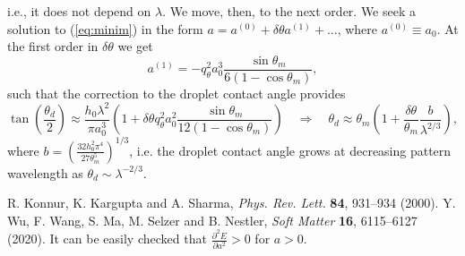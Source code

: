 \documentclass[amsmath,amssymb,showpacs,prl,superscriptaddress,notitlepage]{revtex4-1}
\begin{document}
i.e., it does not depend on $\lambda$. We move, then, to the next order. We seek a solution to
(\ref{eq:minim}) in the form $a = a^{(0)} + \delta \theta a^{(1)} + \dots$, where $a^{(0)} \equiv a_0$.
At the first order in $\delta \theta$ we get
\begin{equation}
a^{(1)} = -q_{\theta}^2 a_0^3\frac{\sin \theta_m}{6(1-\cos \theta_m)},
\end{equation}
such that the correction to the droplet contact angle provides
\begin{equation}
  \tan \left(\frac{\theta_d}{2}\right) \approx \frac{h_0 \lambda^2}{\pi a_0^3}
  \left(1+\delta \theta q_{\theta}^2 a_0^2 \frac{\sin \theta_m}{12(1-\cos \theta_m)}\right)
  \quad \Rightarrow \quad \theta_d \approx
  \theta_m \left(1+\frac{\delta \theta}{\theta_m}\frac{b}{\lambda^{2/3}}\right),
\end{equation}  
where $b = \left(\frac{32 h_0^2 \pi^4}{27 \theta_m^5}\right)^{1/3}$,
i.e. the droplet contact angle grows at decreasing pattern wavelength as $\theta_d \sim \lambda^{-2/3}$.

\begin{thebibliography}{99}

 R. Konnur, K. Kargupta and A. Sharma, {\it Phys. Rev. Lett.} {\bf 84}, 931--934 (2000).
 Y. Wu, F. Wang, S. Ma, M. Selzer and B. Nestler,
{\it Soft Matter} {\bf 16}, 6115--6127 (2020).
 It can be easily checked that $\frac{\partial^2 E}{\partial a^2} > 0$ for $a>0$.
  
\end{thebibliography}
\end{document}
